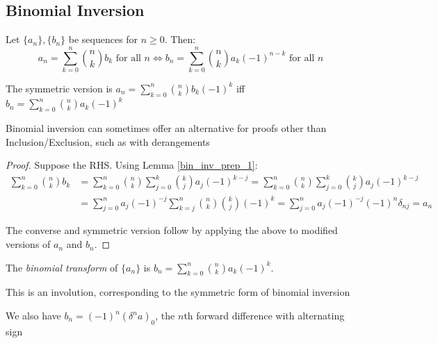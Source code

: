 \documentclass[a4paper]{article}
\begin{document}
\subsection{Binomial Inversion}
\begin{theorem}\label{bin_inv}
Let $\{a_n\},\{b_n\}$ be sequences for $n\geq0$. Then:
\begin{equation*}
a_n=\sum_{k=0}^n\binom nkb_k\text{ for all }n\iff b_n=\sum_{k=0}^n\binom nka_k(-1)^{n-k}\text{ for all }n
\end{equation*}
\begin{arrows}
\item The symmetric version is $\displaystyle a_n=\sum_{k=0}^n\binom nkb_k(-1)^k$ iff $\displaystyle b_n=\sum_{k=0}^n\binom nka_k(-1)^k$
\item Binomial inversion can sometimes offer an alternative for proofs other than Inclusion/Exclusion, such as with derangements
\end{arrows}

\begin{hl}
\begin{proof}
Suppose the RHS. Using Lemma \ref{bin_inv_prep_1}:
\begin{align*}
\sum_{k=0}^n\binom nkb_k
&=\sum_{k=0}^n\binom nk\sum_{j=0}^k\binom kja_j(-1)^{k-j}
=\sum_{k=0}^n\binom nk\sum_{j=0}^k\binom kja_j(-1)^{k-j}\\
&=\sum_{j=0}^na_j(-1)^{-j}\sum_{k=j}^n\binom nk\binom kj(-1)^k
=\sum_{j=0}^na_j(-1)^{-j}(-1)^n\delta_{nj}
=a_n
\end{align*}

The converse and symmetric version follow by applying the above to modified versions of $a_n$ and $b_n$.
\end{proof}
\end{hl}
\end{theorem}

\begin{definition}
The \emph{binomial transform} of $\{a_n\}$ is $b_n=\sum_{k=0}^n\binom nka_k(-1)^k$.
\begin{arrows}
\item This is an involution, corresponding to the symmetric form of binomial inversion
\item We also have $b_n=(-1)^n(\delta^na)_0$, the $n$th forward difference with alternating sign
\end{arrows}
\end{definition}
\end{document}
